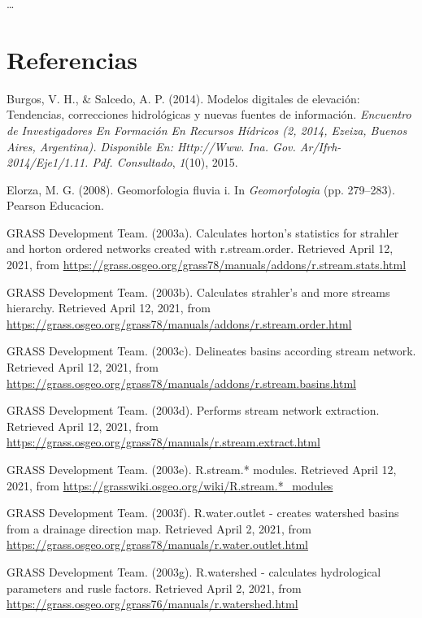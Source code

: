 \documentclass[11pt,]{article}
\begin{document}
\ldots

\section*{Referencias}\label{referencias}

\hypertarget{refs}{}
\hypertarget{ref-burgos2014modelos}{}
Burgos, V. H., \& Salcedo, A. P. (2014). Modelos digitales de elevación:
Tendencias, correcciones hidrológicas y nuevas fuentes de información.
\emph{Encuentro de Investigadores En Formación En Recursos Hídricos (2,
2014, Ezeiza, Buenos Aires, Argentina). Disponible En: Http://Www. Ina.
Gov. Ar/Ifrh-2014/Eje1/1.11. Pdf. Consultado}, \emph{1}(10), 2015.

\hypertarget{ref-GutierrezElorza}{}
Elorza, M. G. (2008). Geomorfologia fluvia i. In \emph{Geomorfologia}
(pp. 279--283). Pearson Educacion.

\hypertarget{ref-addonrstreamstats}{}
GRASS Development Team. (2003a). Calculates horton's statistics for
strahler and horton ordered networks created with r.stream.order.
Retrieved April 12, 2021, from
\url{https://grass.osgeo.org/grass78/manuals/addons/r.stream.stats.html}

\hypertarget{ref-addonrstreamorder}{}
GRASS Development Team. (2003b). Calculates strahler's and more streams
hierarchy. Retrieved April 12, 2021, from
\url{https://grass.osgeo.org/grass78/manuals/addons/r.stream.order.html}

\hypertarget{ref-addonrstreambasins}{}
GRASS Development Team. (2003c). Delineates basins according stream
network. Retrieved April 12, 2021, from
\url{https://grass.osgeo.org/grass78/manuals/addons/r.stream.basins.html}

\hypertarget{ref-addonrstreamextract}{}
GRASS Development Team. (2003d). Performs stream network extraction.
Retrieved April 12, 2021, from
\url{https://grass.osgeo.org/grass78/manuals/r.stream.extract.html}

\hypertarget{ref-addonrstream}{}
GRASS Development Team. (2003e). R.stream.* modules. Retrieved April 12,
2021, from \url{https://grasswiki.osgeo.org/wiki/R.stream.*_modules}

\hypertarget{ref-addonrwateroutlet}{}
GRASS Development Team. (2003f). R.water.outlet - creates watershed
basins from a drainage direction map. Retrieved April 2, 2021, from
\url{https://grass.osgeo.org/grass78/manuals/r.water.outlet.html}

\hypertarget{ref-addonrwater}{}
GRASS Development Team. (2003g). R.watershed - calculates hydrological
parameters and rusle factors. Retrieved April 2, 2021, from
\url{https://grass.osgeo.org/grass76/manuals/r.watershed.html}
\end{document}
